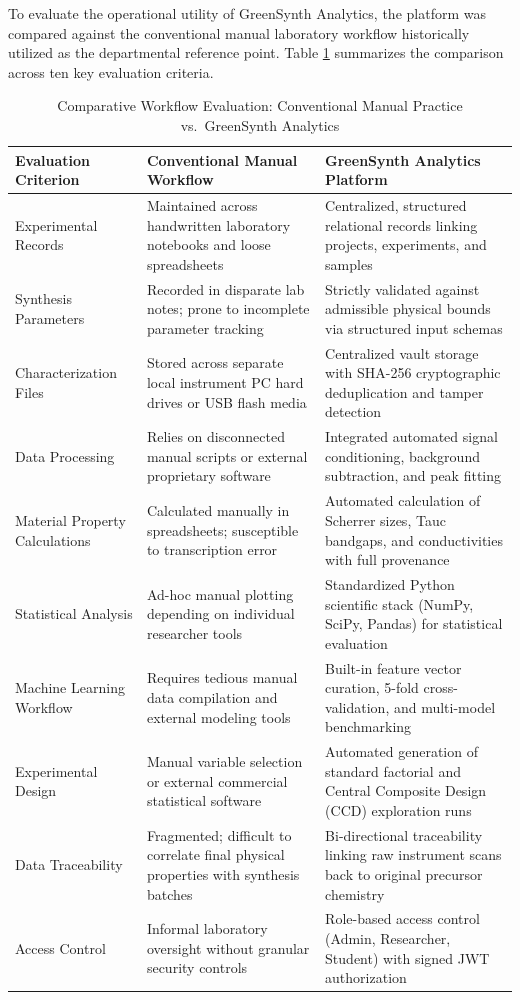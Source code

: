 \documentclass[12pt,a4paper,oneside]{report}
\begin{document}
{{{To evaluate the operational utility of GreenSynth Analytics, the platform was compared against the conventional manual laboratory workflow historically utilized as the departmental reference point. Table \ref{tab:comp_workflow} summarizes the comparison across ten key evaluation criteria.

\begin{table}[!htbp]
\centering
\footnotesize
\setlength{\tabcolsep}{4.5pt}
\renewcommand{\arraystretch}{1.25}
\caption{Comparative Workflow Evaluation: Conventional Manual Practice vs.\ GreenSynth Analytics}
\label{tab:comp_workflow}
\begin{tabular}{|p{2.8cm}|p{5.2cm}|p{6.3cm}|}
\hline
\textbf{Evaluation Criterion} & \textbf{Conventional Manual Workflow} & \textbf{GreenSynth Analytics Platform} \\
\hline
Experimental Records & Maintained across handwritten laboratory notebooks and loose spreadsheets & Centralized, structured relational records linking projects, experiments, and samples \\
\hline
Synthesis Parameters & Recorded in disparate lab notes; prone to incomplete parameter tracking & Strictly validated against admissible physical bounds via structured input schemas \\
\hline
Characterization Files & Stored across separate local instrument PC hard drives or USB flash media & Centralized vault storage with SHA-256 cryptographic deduplication and tamper detection \\
\hline
Data Processing & Relies on disconnected manual scripts or external proprietary software & Integrated automated signal conditioning, background subtraction, and peak fitting \\
\hline
Material Property Calculations & Calculated manually in spreadsheets; susceptible to transcription error & Automated calculation of Scherrer sizes, Tauc bandgaps, and conductivities with full provenance \\
\hline
Statistical Analysis & Ad-hoc manual plotting depending on individual researcher tools & Standardized Python scientific stack (NumPy, SciPy, Pandas) for statistical evaluation \\
\hline
Machine Learning Workflow & Requires tedious manual data compilation and external modeling tools & Built-in feature vector curation, 5-fold cross-validation, and multi-model benchmarking \\
\hline
Experimental Design & Manual variable selection or external commercial statistical software & Automated generation of standard factorial and Central Composite Design (CCD) exploration runs \\
\hline
Data Traceability & Fragmented; difficult to correlate final physical properties with synthesis batches & Bi-directional traceability linking raw instrument scans back to original precursor chemistry \\
\hline
Access Control & Informal laboratory oversight without granular security controls & Role-based access control (Admin, Researcher, Student) with signed JWT authorization \\
\hline
\end{tabular}
\end{table}

}}}
\end{document}
